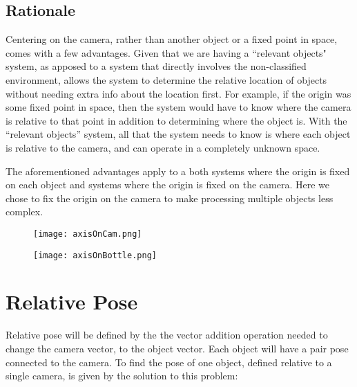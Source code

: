 \documentclass{article}
\begin{document}
\subsection{Rationale}
Centering on the camera, rather than another object or a fixed point in space, comes with a few advantages. Given that we are having a ``relevant objects" system, as apposed to a system that directly involves the non-classified environment, allows the system to determine the relative location of objects without needing extra info about the location first. For example, if the origin was some fixed point in space, then the system would have to know where the camera is relative to that point in addition to determining where the object is. With the ``relevant objects'' system, all that the system needs to know is where each object is relative to the camera, and can operate in a completely unknown space.

The aforementioned advantages apply to a both systems where the origin is fixed on each object and systems where the origin is fixed on the camera. Here we chose to fix the origin on the camera to make processing multiple objects less complex.  

\begin{figure}[H]
    \centering
    \texttt{[image: axisOnCam.png]}
   \label{fig:compute}
    \caption{}
\end{figure}
\begin{figure}[H]
    \centering
    \texttt{[image: axisOnBottle.png]}
   \label{fig:compute}
    \caption{}
\end{figure}


\section{Relative Pose}

Relative pose will be defined by the the vector addition operation needed to change the camera vector, to the object vector. Each object will have a pair pose connected to the camera. To find the pose of one object, defined relative to a single camera, is given by the solution to this problem:
\end{document}
